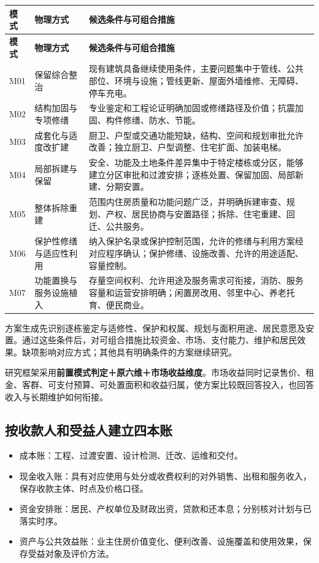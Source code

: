 \documentclass[UTF8,11pt,fontset=windows]{ctexart}
\begin{document}
\begin{longtable}{@{}L{16mm}L{44mm}L{99mm}@{}}
\toprule
\textbf{模式} & \textbf{物理方式} & \textbf{候选条件与可组合措施}\\\midrule\endfirsthead
\toprule\textbf{模式} & \textbf{物理方式} & \textbf{候选条件与可组合措施}\\\midrule\endhead
M01 & 保留综合整治 & 现有建筑具备继续使用条件，主要问题集中于管线、公共部位、环境与设施；管线更新、屋面外墙维修、无障碍、停车充电。\\
M02 & 结构加固与专项修缮 & 专业鉴定和工程论证明确加固或修缮路径及价值；抗震加固、构件修缮、防水、节能。\\
M03 & 成套化与适度改扩建 & 厨卫、户型或交通功能短缺，结构、空间和规划审批允许改善；独立厨卫、户型调整、住宅扩面、加装电梯。\\
M04 & 局部拆建与保留 & 安全、功能及土地条件差异集中于特定楼栋或分区，能够建立分区审批和过渡安排；逐栋处置、保留加固、局部新建、分期安置。\\
M05 & 整体拆除重建 & 范围内住房质量和功能问题广泛，并明确拆建审查、规划、产权、居民协商与安置路径；拆除、住宅重建、回迁、公共服务。\\
M06 & 保护性修缮与适应性利用 & 纳入保护名录或保护控制范围，允许的修缮与利用方案经对应程序确认；保护修缮、设施改善、允许的用途适配、容量控制。\\
M07 & 功能置换与服务设施植入 & 存量空间权利、允许用途及服务需求可衔接，消防、服务容量和运营安排明确；闲置房改用、邻里中心、养老托育、便民商业。\\
\bottomrule\end{longtable}

方案生成先识别逐栋鉴定与适修性、保护和权属、规划与面积用途、居民意愿及安置。通过这些条件后，对可组合措施比较资金、市场、支付能力、维护和居民效果。缺项影响对应方式；其他具有明确条件的方案继续研究。

研究框架采用\textbf{前置模式判定＋原六维＋市场收益维度}。市场收益同时记录售价、租金、客群、可支付预算、可处置面积和收益归属，使方案比较既回答投入，也回答收入与长期维护如何衔接。

\subsection{按收款人和受益人建立四本账}

\begin{itemize}
\item 成本账：工程、过渡安置、设计检测、迁改、运维和交付。
\item 现金收入账：具有对应使用与处分或收费权利的对外销售、出租和服务收入，保存收款主体、时点及价格口径。
\item 资金安排账：居民、产权单位及财政出资，贷款和还本息；分别核对计划与已落实时序。
\item 资产与公共效益账：业主住房价值变化、便利改善、设施覆盖和使用效果，保存受益对象及评价方法。
\end{itemize}
\end{document}

